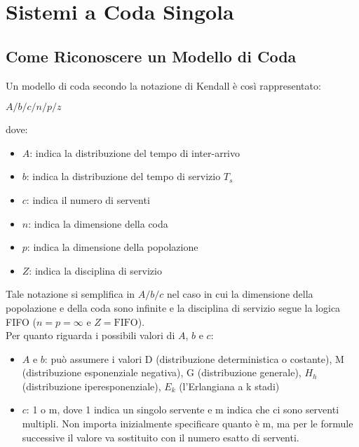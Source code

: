 \chapter{Sistemi a Coda Singola}
\section{Come Riconoscere un Modello di Coda}
Un modello di coda secondo la notazione di Kendall è così rappresentato:
\begin{center}
    $A/b/c/n/p/z$
\end{center}

dove:

\begin{itemize}
    \item $A$: indica la distribuzione del tempo di inter-arrivo
    \item $b$: indica la distribuzione del tempo di servizio $T_s$
    \item $c$: indica il numero di serventi
    \item $n$: indica la dimensione della coda
    \item $p$: indica la dimensione della popolazione
    \item $Z$: indica la disciplina di servizio
\end{itemize}
Tale notazione si semplifica in $A/b/c$ nel caso in cui la dimensione della
popolazione e della coda sono infinite e la disciplina di servizio segue la
logica FIFO ($n = p = \infty$ e $Z = \text{FIFO}$).\\
Per quanto riguarda i possibili valori di $A$, $b$ e $c$:

\begin{itemize}
    \item $A$ e $b$: può assumere i valori D (distribuzione deterministica o
          costante), M (distribuzione esponenziale negativa), G (distribuzione
          generale), $H_h$ (distribuzione iperesponenziale), $E_k$ (l'Erlangiana
          a k stadi)
    \item $c$: 1 o m, dove 1 indica un singolo servente e m indica che ci sono
          serventi multipli. Non importa inizialmente specificare quanto è m, ma
          per le formule successive il valore va sostituito con il numero esatto
          di serventi.
\end{itemize}

